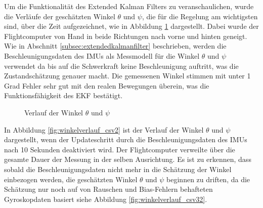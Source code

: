 Um die Funktionalität des Extended Kalman Filters zu veranschaulichen, wurde die Verläufe der geschätzten Winkel $\theta$ und $\psi$, die für die Regelung am wichtigsten sind, über die Zeit aufgezeichnet, wie in Abbildung \ref{fig:winkelverlauf_csv} dargestellt. Dabei wurde der Flightcomputer von Hand in beide Richtungen nach vorne und hinten geneigt. Wie in Abschnitt \ref{subsec:extendedkalmanfilter} beschrieben, werden die Beschleunigungsdaten des IMUs als Messmodell für die Winkel $\theta$ und $\psi$ verwendet da bis auf die Schwerkraft keine Beschleunigung auftritt, was die Zustandschätzung genauer macht. Die gemessenen Winkel stimmen mit unter 1 Grad Fehler sehr gut mit den realen Bewegungen überein, was die Funktionsfähigkeit des EKF bestätigt.
\begin{figure}[H]
    \vspace{-0.5cm}
    \centering
    \caption{Verlauf der Winkel $\theta$ und $\psi$}
    \label{fig:winkelverlauf_csv}
    \vspace{-0.5cm}
\end{figure}
In Abbildung \ref{fig:winkelverlauf_csv2} ist der Verlauf der Winkel $\theta$ und $\psi$ dargestellt, wenn der Updateschritt durch die Beschleunigungsdaten des IMUs nach 10 Sekunden deaktiviert wird. Der Flightcomputer verweilte über die gesamte Dauer der Messung in der selben Ausrichtung. Es ist zu erkennen, dass sobald die Beschleunigungsdaten nicht mehr in die Schätzung der Winkel einbezogen werden, die geschätzten Winkel $\theta$ und $\psi$ beginnen zu driften, da die Schätzung nur noch auf von Rauschen und Bias-Fehlern behafteten Gyroskopdaten basiert siehe Abbildung \ref{fig:winkelverlauf_csv32}.
